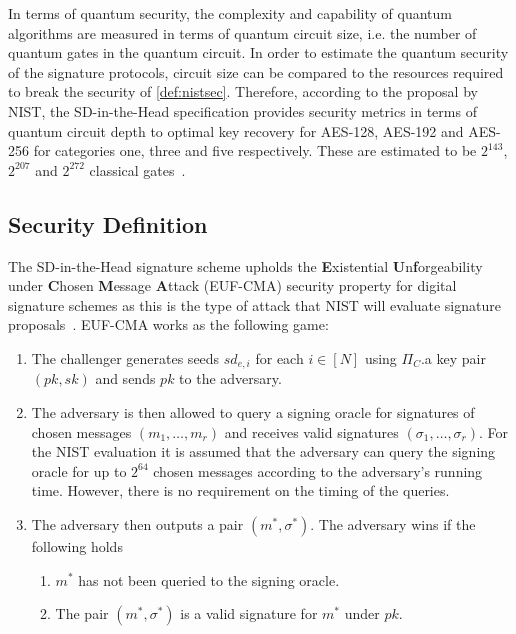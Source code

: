 \documentclass[11pt]{report}
\theoremstyle{definition}
\theoremstyle{plain}
\begin{document}
In terms of quantum security, the complexity and capability of quantum algorithms are measured in terms of quantum circuit size, i.e. the number of quantum gates in the quantum circuit. In order to estimate the quantum security of the signature protocols, circuit size can be compared to the resources required to break the security of \autoref{def:nistsec}. Therefore,
according to the proposal by NIST, the SD-in-the-Head specification provides security metrics in terms of quantum circuit depth to optimal key recovery for AES-128, AES-192 and AES-256 for categories one, three and five respectively. These are estimated to be $2^{143}$, $2^{207}$ and $2^{272}$ classical gates~\cite{nistcall}.

\subsection{Security Definition}

The SD-in-the-Head signature scheme upholds the \textbf{E}xistential \textbf{U}n\textbf{f}orgeability under \textbf{C}hosen \textbf{M}essage \textbf{A}ttack (EUF-CMA) security property for digital signature schemes as this is the type of attack that NIST will evaluate signature proposals~\cite{nistcall,aguilarsyndrome11}. EUF-CMA works as the following game:

\begin{enumerate}
  \item The challenger generates seeds $sd_{e,i}$ for each $i \in [N]$ using $\Pi_C$.a key pair $(pk, sk)$ and sends $pk$ to the adversary.
  \item The adversary is then allowed to query a signing oracle for signatures of chosen messages $(m_1, \dots, m_r)$ and receives valid signatures $(\sigma_1, \dots, \sigma_r)$. For the NIST evaluation it is assumed that the adversary can query the signing oracle for up to $2^{64}$ chosen messages according to the adversary's running time. However, there is no requirement on the timing of the queries.
  \item The adversary then outputs a pair $(m^*, \sigma^*)$. The adversary wins if the following holds
        \begin{enumerate}
          \item $m^*$ has not been queried to the signing oracle.
          \item The pair $(m^*, \sigma^*)$ is a valid signature for $m^*$ under $pk$.
        \end{enumerate}
\end{enumerate}
\end{document}
